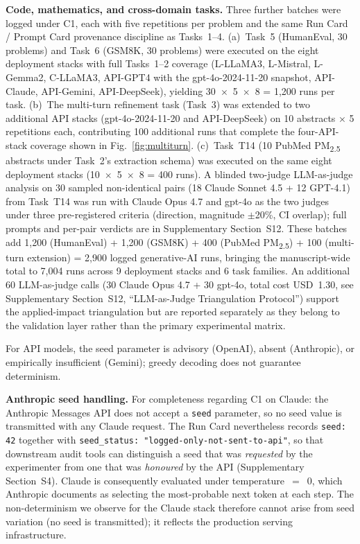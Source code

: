 \documentclass[sn-nature]{sn-jnl}
\begin{document}
\textbf{Code, mathematics, and cross-domain tasks.} Three further batches were logged under C1, each with five repetitions per problem and the same Run Card / Prompt Card provenance discipline as Tasks~1--4.
(a)~Task~5 (HumanEval, 30 problems) and Task~6 (GSM8K, 30 problems) were executed on the eight deployment stacks with full Tasks~1--2 coverage (L-LLaMA3, L-Mistral, L-Gemma2, C-LLaMA3, API-GPT4 with the gpt-4o-2024-11-20 snapshot, API-Claude, API-Gemini, API-DeepSeek), yielding 30~$\times$~5~$\times$~8 = 1{,}200 runs per task.
(b)~The multi-turn refinement task (Task~3) was extended to two additional API stacks (gpt-4o-2024-11-20 and API-DeepSeek) on 10 abstracts $\times$ 5 repetitions each, contributing 100 additional runs that complete the four-API-stack coverage shown in Fig.~\ref{fig:multiturn}.
(c)~Task~T14 (10 PubMed PM\textsubscript{2.5} abstracts under Task~2's extraction schema) was executed on the same eight deployment stacks (10~$\times$~5~$\times$~8 = 400 runs).
A blinded two-judge LLM-as-judge analysis on 30 sampled non-identical pairs (18 Claude Sonnet 4.5 + 12 GPT-4.1) from Task~T14 was run with Claude Opus 4.7 and gpt-4o as the two judges under three pre-registered criteria (direction, magnitude $\pm$20\%, CI overlap); full prompts and per-pair verdicts are in Supplementary Section~S12.
These batches add 1{,}200 (HumanEval) + 1{,}200 (GSM8K) + 400 (PubMed PM\textsubscript{2.5}) + 100 (multi-turn extension) = 2{,}900 logged generative-AI runs, bringing the manuscript-wide total to 7{,}004 runs across 9 deployment stacks and 6 task families. An additional 60 LLM-as-judge calls (30 Claude Opus 4.7 + 30 gpt-4o, total cost USD~1.30, see Supplementary Section~S12, ``LLM-as-Judge Triangulation Protocol'') support the applied-impact triangulation but are reported separately as they belong to the validation layer rather than the primary experimental matrix.

For API models, the seed parameter is advisory (OpenAI\cite{openai2024seed}), absent (Anthropic), or empirically insufficient (Gemini); greedy decoding does not guarantee determinism\cite{ouyang2024nondeterminism}.

\textbf{Anthropic seed handling.}
For completeness regarding C1 on Claude: the Anthropic Messages API does not accept a \texttt{seed} parameter, so no seed value is transmitted with any Claude request.
The Run Card nevertheless records \texttt{seed: 42} together with \texttt{seed\_status: "logged-only-not-sent-to-api"}, so that downstream audit tools can distinguish a seed that was \emph{requested} by the experimenter from one that was \emph{honoured} by the API (Supplementary Section~S4).
Claude is consequently evaluated under temperature~$=$~0, which Anthropic documents as selecting the most-probable next token at each step.
The non-determinism we observe for the Claude stack therefore cannot arise from seed variation (no seed is transmitted); it reflects the production serving infrastructure.
\end{document}

